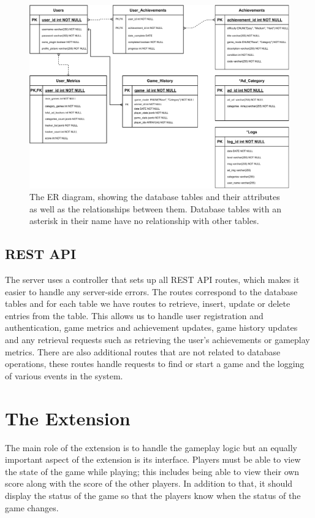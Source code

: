 \documentclass{l4proj}
\begin{document}
\begin{figure}
    \centering
    \includegraphics[width=1\linewidth]{images/ER_diagram.pdf}    

    \caption{The ER diagram, showing the database tables and their attributes as well as the relationships between them. Database tables with an asterisk in their name have no relationship with other tables. }

    \label{fig:ER} 
\end{figure}

\subsection{REST API}
The server uses a controller that sets up all REST API routes, which makes it easier to handle any server-side errors. The routes correspond to the database tables and for each table we have routes to retrieve, insert, update or delete entries from the table. This allows us to handle user registration and authentication, game metrics and achievement updates, game history updates and any retrieval requests such as retrieving the user's achievements or gameplay metrics. There are also additional routes that are not related to database operations, these routes handle requests to find or start a game and the logging of various events in the system.

\section{The Extension}
The main role of the extension is to handle the gameplay logic but an equally important aspect of the extension is its interface. Players must be able to view the state of the game while playing; this includes being able to view their own score along with the score of the other players. In addition to that, it should display the status of the game so that the players know when the status of the game changes.
\end{document}
